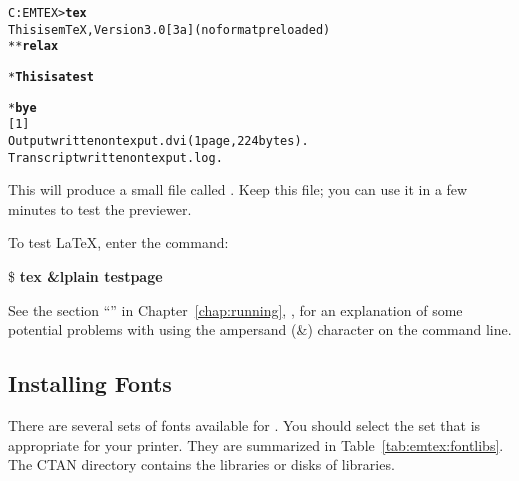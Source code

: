 \begin{exindent}
\begin{alltt}
C:\ttbackslash{}EMTEX>{\bf tex}
This is emTeX, Version 3.0 [3a] (no format preloaded)
**{\bf \ttbackslash{}relax}

*{\bf This is a test}

*{\bf \ttbackslash{}bye}
[1]
Output written on texput.dvi (1 page, 224 bytes).
Transcript written on texput.log.
\end{alltt}
\end{exindent}

This will produce a small  file 
called .  Keep
this file; you can use it in a few minutes to test the previewer.

To test \LaTeX, enter the command:

\begin{ttindent}
\$ \textbf{tex &lplain testpage}
\end{ttindent}

See the section ``'' 
in Chapter~\ref{chap:running}, {\it {}\/}, 
for an explanation of some potential problems with
using the ampersand (\&) character on the command line.

\newpage
\subsection{Installing Fonts}

There 
are several sets of fonts available for \emTeX.  You should select
the set that is appropriate for your printer.   They are summarized in
Table~\ref{tab:emtex:fontlibs}.  The CTAN directory
contains the libraries or disks of libraries.

